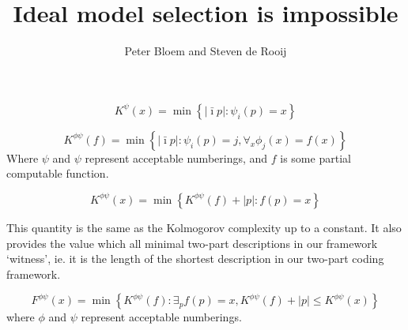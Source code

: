 \documentclass{style/llncs}
\title{Ideal model selection is impossible}
\author{Peter Bloem and Steven de Rooij}
\begin{document}
\maketitle

\begin{definition}
\[
K^\psi(x) = \min\left\{|\bar\imath p| : \psi_i(p) = x\right\}
\]
\end{definition}

\begin{definition}
\[
K^{\phi\psi}(f) = \min\left\{|\bar\imath p| : \psi_i(p) = j, \forall_x\phi_j(x) = f(x)\right\}
\]
Where $\psi$ and $\psi$ represent acceptable numberings, and $f$ is some partial computable function.
\end{definition}

\begin{definition}
\[
K^{\phi\psi}(x) = \min\left\{K^{\phi\psi}(f) + |p|: f(p) = x\right\}
\]
\end{definition}
This quantity is the same as the Kolmogorov complexity up to a constant. It also provides the value which all minimal two-part descriptions in our framework `witness', ie. it is the length of the shortest description in our two-part coding framework.

\begin{definition}[Sophistication]
\[
F^{\phi\psi}(x) = \min\left\{K^{\phi\psi}(f) : \exists_p f(p) = x, K^{\phi\psi}(f)+|p| \leq K^{\phi\psi}(x)\right\}
\]
where $\phi$ and $\psi$ represent acceptable numberings.
\end{definition}
\end{document}
